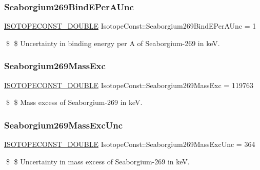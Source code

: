 \subsubsection{\texorpdfstring{Seaborgium269\+Bind\+E\+Per\+A\+Unc}{Seaborgium269BindEPerAUnc}}
{\footnotesize\ttfamily \mbox{\hyperlink{group___isotope_const-_macros_ga8f45a7272ce02c0b4c65c44636ed719a}{I\+S\+O\+T\+O\+P\+E\+C\+O\+N\+S\+T\+\_\+\+D\+O\+U\+B\+LE}} Isotope\+Const\+::\+Seaborgium269\+Bind\+E\+Per\+A\+Unc = 1}

\$ \$ Uncertainty in binding energy per A of Seaborgium-\/269 in keV. \mbox{\label{group___isotope_const-_seaborgium-_sg269_ga18fa070d5592933e34a4557924685dca}} 
\subsubsection{\texorpdfstring{Seaborgium269\+Mass\+Exc}{Seaborgium269MassExc}}
{\footnotesize\ttfamily \mbox{\hyperlink{group___isotope_const-_macros_ga8f45a7272ce02c0b4c65c44636ed719a}{I\+S\+O\+T\+O\+P\+E\+C\+O\+N\+S\+T\+\_\+\+D\+O\+U\+B\+LE}} Isotope\+Const\+::\+Seaborgium269\+Mass\+Exc = 119763}

\$ \$ Mass excess of Seaborgium-\/269 in keV. \mbox{\label{group___isotope_const-_seaborgium-_sg269_ga9528f3852c687923c414d1bf674994e3}} 
\subsubsection{\texorpdfstring{Seaborgium269\+Mass\+Exc\+Unc}{Seaborgium269MassExcUnc}}
{\footnotesize\ttfamily \mbox{\hyperlink{group___isotope_const-_macros_ga8f45a7272ce02c0b4c65c44636ed719a}{I\+S\+O\+T\+O\+P\+E\+C\+O\+N\+S\+T\+\_\+\+D\+O\+U\+B\+LE}} Isotope\+Const\+::\+Seaborgium269\+Mass\+Exc\+Unc = 364}

\$ \$ Uncertainty in mass excess of Seaborgium-\/269 in keV. \mbox{\label{group___isotope_const-_seaborgium-_sg269_gaf476a6c19fae7e4f9acfb1fbbe7ea61b}} 

